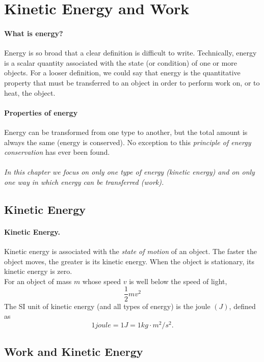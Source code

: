 \documentclass{article}
\begin{document}
\section{Kinetic Energy and Work}
\paragraph{What is energy?}Energy is so broad that a clear definition is difficult to write. Technically, energy is a scalar quantity associated with the state (or condition) of one or more objects. For a looser definition, we could say that energy is the quantitative property that must be transferred to an object in order to perform work on, or to heat, the object.
\paragraph{Properties of energy}Energy can be transformed from one type to another, but the total amount is always the same (energy is conserved). No exception to this \emph{principle of energy conservation} has ever been found. 
\\\\
\textit{In this chapter we focus on only one type of energy \emph{(kinetic energy)} and on only one way in which energy can be transferred \emph{(work).}}
\subsection{Kinetic Energy}
\paragraph{Kinetic Energy.}Kinetic energy is associated with the \textit{state of motion} of an object. The faster the object moves, the greater is its kinetic energy. When the object is stationary, its kinetic energy is zero.
\\
For an object of mass $m$ whose speed $v$ is well below the speed of light, 
\begin{equation}
    \frac{1}{2}mv^2
\end{equation}
The SI unit of kinetic energy (and all types of energy) is the joule $(J)$, defined as
\begin{equation}
    1 joule = 1 J = 1 kg \cdot m^2/s^2.
\end{equation}
\subsection{Work and Kinetic Energy}
\end{document}
